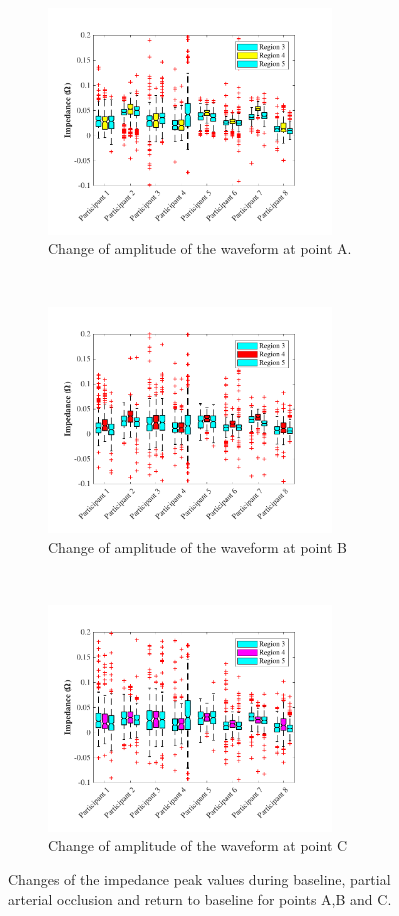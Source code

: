 \begin{figure}[!htbp]
	\centering
	\begin{subfigure}[t]{0.48\textwidth}
		\centering
		\includegraphics[height=6cm,keepaspectratio]{figure9a2}    
		\caption{Change of amplitude of the waveform at point A.}
		\label{fig:change_A_arterial}
	\end{subfigure}%
	~ 
	\begin{subfigure}[t]{0.48\textwidth}
		\centering
		\includegraphics[height=6cm,keepaspectratio,keepaspectratio]{figure9b2}    
		\caption{Change of amplitude of the waveform at point B}
		\label{fig:change_B_arterial}
	\end{subfigure}
	~
	\begin{subfigure}[t]{0.48\textwidth}
		\centering
		\includegraphics[height=6cm,keepaspectratio]{figure9c2}    
		\caption{Change of amplitude of the waveform at point C}
		\label{fig:change_C_arterial}
	\end{subfigure}%
	\caption{Changes of the impedance peak values during baseline, partial arterial occlusion and return to baseline for points A,B and C.}
	\label{fig:iPG_change_points_arterial}
\end{figure}

